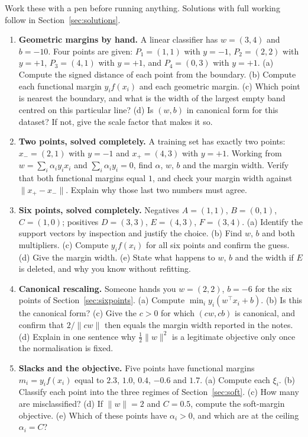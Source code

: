 \documentclass[11pt]{article}
\begin{document}
Work these with a pen before running anything. Solutions with full working
follow in Section~\ref{sec:solutions}.

\begin{enumerate}[leftmargin=*]
  \item \textbf{Geometric margins by hand.} A linear classifier has
    $w = (3, 4)$ and $b = -10$. Four points are given:
    $P_1 = (1,1)$ with $y = -1$, $P_2 = (2,2)$ with $y = +1$,
    $P_3 = (4,1)$ with $y = +1$, and $P_4 = (0,3)$ with $y = +1$.
    (a) Compute the signed distance of each point from the boundary.
    (b) Compute each functional margin $y_i f(x_i)$ and each geometric margin.
    (c) Which point is nearest the boundary, and what is the width of the
    largest empty band centred on this particular line? (d) Is $(w,b)$ in
    canonical form for this dataset? If not, give the scale factor that makes
    it so.

  \item \textbf{Two points, solved completely.} A training set has exactly two
    points: $x_- = (2,1)$ with $y = -1$ and $x_+ = (4,3)$ with $y = +1$.
    Working from $w = \sum_i \alpha_i y_i x_i$ and $\sum_i \alpha_i y_i = 0$,
    find $\alpha$, $w$, $b$ and the margin width. Verify that both functional
    margins equal $1$, and check your margin width against
    $\|x_+ - x_-\|$. Explain why those last two numbers must agree.

  \item \textbf{Six points, solved completely.} Negatives $A = (1,1)$,
    $B = (0,1)$, $C = (1,0)$; positives $D = (3,3)$, $E = (4,3)$, $F = (3,4)$.
    (a) Identify the support vectors by inspection and justify the choice.
    (b) Find $w$, $b$ and both multipliers. (c) Compute $y_i f(x_i)$ for all
    six points and confirm the guess. (d) Give the margin width. (e) State
    what happens to $w$, $b$ and the width if $E$ is deleted, and why you know
    without refitting.

  \item \textbf{Canonical rescaling.} Someone hands you $w = (2,2)$,
    $b = -6$ for the six points of Section~\ref{sec:sixpoints}.
    (a) Compute $\min_i y_i(w^\top x_i + b)$. (b) Is this the canonical form?
    (c) Give the $c > 0$ for which $(cw, cb)$ is canonical, and confirm that
    $2/\|cw\|$ then equals the margin width reported in the notes.
    (d) Explain in one sentence why $\tfrac12\|w\|^2$ is a legitimate objective
    only once the normalisation is fixed.

  \item \textbf{Slacks and the objective.} Five points have functional margins
    $m_i = y_i f(x_i)$ equal to $2.3$, $1.0$, $0.4$, $-0.6$ and $1.7$.
    (a) Compute each $\xi_i$. (b) Classify each point into the three regimes of
    Section~\ref{sec:soft}. (c) How many are misclassified? (d) If
    $\|w\| = 2$ and $C = 0.5$, compute the soft-margin objective.
    (e) Which of these points have $\alpha_i > 0$, and which are at the
    ceiling $\alpha_i = C$?


\end{enumerate}
\end{document}
